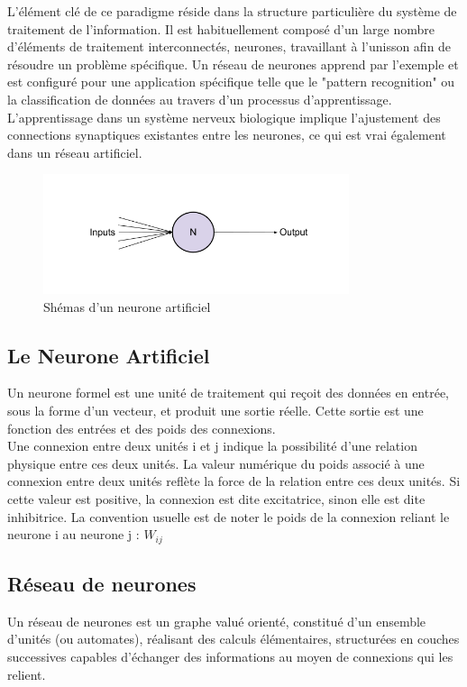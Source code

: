 L'élément clé de ce paradigme réside dans la structure particulière du système de traitement de l'information. Il est habituellement composé d'un large nombre d'éléments de traitement interconnectés, neurones, travaillant à l’unisson afin de résoudre un problème spécifique. Un réseau de neurones apprend par l'exemple et est configuré pour une application spécifique telle que le "pattern recognition" ou la classification de données au travers d'un processus d’apprentissage. L'apprentissage dans un système nerveux biologique implique l'ajustement des connections synaptiques existantes entre les neurones, ce qui est vrai également dans un réseau artificiel.

   
\begin{figure}[H]
    \centering
    \includegraphics[width=0.8\textwidth]{./pictures/neurone.png}
    \caption{Shémas d'un neurone artificiel}
\end{figure}

\subsection{Le Neurone Artificiel}
Un neurone formel est une unité de traitement qui reçoit des données en entrée, sous la forme d’un vecteur, et produit une sortie réelle. Cette sortie est une fonction des entrées et des poids des connexions.\\
Une connexion entre deux unités i et j indique la possibilité d'une relation physique entre ces deux unités.
La valeur numérique du poids associé à une connexion entre deux unités reflète la force de la relation entre ces deux unités. Si cette valeur est positive, la connexion est dite excitatrice, sinon elle est dite inhibitrice. La convention usuelle est de noter le poids de la connexion reliant le neurone
i au neurone j : $W_{ij}$

\subsection{Réseau de neurones}
Un réseau de neurones est un graphe valué orienté, constitué d’un ensemble d’unités (ou automates), réalisant des calculs élémentaires, structurées en couches successives capables d’échanger des informations
au moyen de connexions qui les relient.

